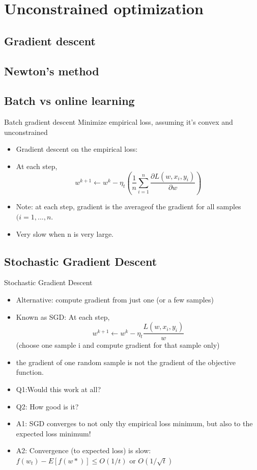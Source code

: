 \documentclass[draft]{beamer}
\begin{document}
\section{Unconstrained optimization} 
\subsection{Gradient descent} 
\subsection{Newton's method} 
\subsection{Batch vs online learning} 
\begin{frame}{Batch gradient descent} 
	Minimize empirical loss, assuming it's convex and unconstrained 
	\begin{itemize}
		\item Gradient descent on the empirical loss: 
		\item At each step, 
		$$w^{k+1} \leftarrow w^{k} - \eta_t 
		\left( \frac{1}{n} \sum_{i=1}^{n}
		 \frac{\partial L(w,x_i,y_i)}{\partial w} \right) $$
		\item Note: at each step, gradient is the averageof the gradient for all samples $(i=1,...,n$. 
		\item Very slow when n  is very large. 
	\end{itemize}
	
\end{frame}

\subsection{Stochastic Gradient Descent} 
\begin{frame}{Stochastic Gradient Descent} 
	\begin{itemize}
		\item Alternative: compute gradient from just one (or a few samples) 
		\item Known as SGD: At each step, 
		\[ w^{k+1} \leftarrow w^{k} - \eta_t \frac{L(w,x_i,y_i)}{w}  \] 
		(choose one sample i and compute gradient for that sample only) 
		\item the gradient of one random sample is not the gradient of the objective function. 
		\item Q1:Would this work at all? 
		\item Q2: How good is it? 
		\item<2-> A1: SGD converges to not only thy empirical loss minimum, but also to the expected loss minimum! 
		\item<2-> A2: Convergence (to expected loss) is slow: $f(w_t) -E[f(w*)] \le O(1/t) $ or $O(1/\sqrt{t}) $
	\end{itemize}
\end{frame}
\end{document}
